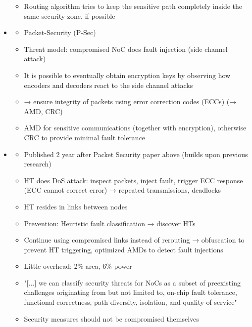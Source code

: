 \documentclass[
	paper=a4,
	fontsize=11pt,
	parskip=full %
]{scrreprt}
\begin{document}
\begin{itemize}
\begin{itemize}
                \item Routing algorithm tries to keep the sensitive path completely inside the same security zone, if possible
            \end{itemize}
        \item \textbf{}
            \begin{itemize}
                \item Packet-Security (P-Sec)
                \item Threat model: compromised NoC does fault injection (side channel attack)
                \item It is possible to eventually obtain encryption keys by observing how encoders and decoders react to the side channel attacks
                \item → ensure integrity of packets using error correction codes (ECCs) (→ AMD, CRC)
                \item AMD for sensitive communications (together with encryption), otherwise CRC to provide minimal fault tolerance
            \end{itemize}
        \item \textbf{}
            \begin{itemize}
                \item Published 2 year after Packet Security paper above (builds upon previous research)
                \item HT does DoS attack: inspect packets, inject fault, trigger ECC response (ECC cannot correct error) → repeated transmissions,
                    deadlocks
                \item HT resides in links between nodes
                \item Prevention: Heuristic fault classification → discover HTs
                \item Continue using compromised links instead of rerouting → obfuscation to prevent HT triggering, optimized AMDs to detect fault
                    injections
                \item Little overhead: 2\% area, 6\% power
                \item "[...] we can classify security threats for NoCs as a subset of preexisting challenges originating from but not limited to,
                    on-chip fault tolerance, functional correctness, path diversity, isolation, and quality of service"
                \item Security measures should not be compromised themselves

\end{itemize}
\end{itemize}
\end{document}
